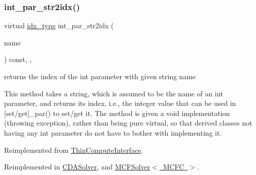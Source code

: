 \mbox{\label{class_s_m_spp__di__unipi__it_1_1_solver_ae281b6699b0707a5cdc1e82b76d26c09}} 
\subsubsection{\texorpdfstring{int\+\_\+par\+\_\+str2idx()}{int\_par\_str2idx()}}
{\footnotesize\ttfamily virtual \mbox{\hyperlink{class_s_m_spp__di__unipi__it_1_1_thin_compute_interface_aa3d710629ad8c434286726ad810c3b47}{idx\+\_\+type}} int\+\_\+par\+\_\+str2idx (\begin{DoxyParamCaption}\item[{const std\+::string \&}]{name }\end{DoxyParamCaption}) const\hspace{0.3cm}{\ttfamily [inline]}, {\ttfamily [override]}, {\ttfamily [virtual]}}



returns the index of the int parameter with given string name 

This method takes a string, which is assumed to be the name of an int parameter, and returns its index, i.\+e., the integer value that can be used in \mbox{[}set/get\mbox{]}\+\_\+par() to set/get it. The method is given a void implementation (throwing exception), rather than being pure virtual, so that derived classes not having any int parameter do not have to bother with implementing it. 

Reimplemented from \mbox{\hyperlink{class_s_m_spp__di__unipi__it_1_1_thin_compute_interface_a69c6857c4288135135e8b6bbcf24252a}{Thin\+Compute\+Interface}}.



Reimplemented in \mbox{\hyperlink{class_s_m_spp__di__unipi__it_1_1_c_d_a_solver_ae281b6699b0707a5cdc1e82b76d26c09}{C\+D\+A\+Solver}}, and \mbox{\hyperlink{class_s_m_spp__di__unipi__it_1_1_m_c_f_solver_ae281b6699b0707a5cdc1e82b76d26c09}{M\+C\+F\+Solver$<$ M\+C\+F\+C $>$}}.

\mbox{\label{class_s_m_spp__di__unipi__it_1_1_solver_a038fa1e554e91724e1ce3f593aba55fd}} 
